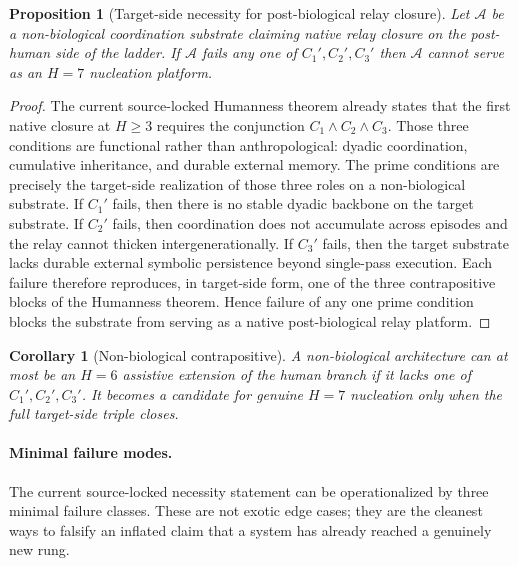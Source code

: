 \documentclass[11pt]{article}
\newtheorem{proposition}{Proposition}
\newtheorem{corollary}{Corollary}
\begin{document}
\begin{proposition}[Target-side necessity for post-biological relay closure]
\label{prop:S-AIsubstrate-necessity}
Let
$\mathcal{A}$
be a non-biological coordination substrate claiming native relay closure on the
post-human side of the ladder.
If
$\mathcal{A}$
fails any one of
$C_1',C_2',C_3'$
then
$\mathcal{A}$
cannot serve as an
$H{=}7$
nucleation platform.
\end{proposition}

\begin{proof}
The current source-locked Humanness theorem already states that the first
native closure at
$H\ge 3$
requires the conjunction
$C_1\wedge C_2\wedge C_3$.
Those three conditions are functional rather than anthropological:
dyadic coordination,
cumulative inheritance,
and durable external memory.
The prime conditions are precisely the target-side realization of those three
roles on a non-biological substrate.
If
$C_1'$
fails,
then there is no stable dyadic backbone on the target substrate.
If
$C_2'$
fails,
then coordination does not accumulate across episodes and the relay cannot
thicken intergenerationally.
If
$C_3'$
fails,
then the target substrate lacks durable external symbolic persistence beyond
single-pass execution.
Each failure therefore reproduces,
in target-side form,
one of the three contrapositive blocks of the Humanness theorem.
Hence failure of any one prime condition blocks the substrate from serving as a
native post-biological relay platform.
\end{proof}

\begin{corollary}[Non-biological contrapositive]
\label{cor:S-AIsubstrate-contrapositive}
A non-biological architecture can at most be an
$H{=}6$
assistive extension of the human branch if it lacks one of
$C_1',C_2',C_3'$.
It becomes a candidate for genuine
$H{=}7$
nucleation only when the full target-side triple closes.
\end{corollary}

\paragraph{Minimal failure modes.}
The current source-locked necessity statement can be operationalized by three
minimal failure classes.
These are not exotic edge cases;
they are the cleanest ways to falsify an inflated claim that a system has
already reached a genuinely new rung.
\end{document}

